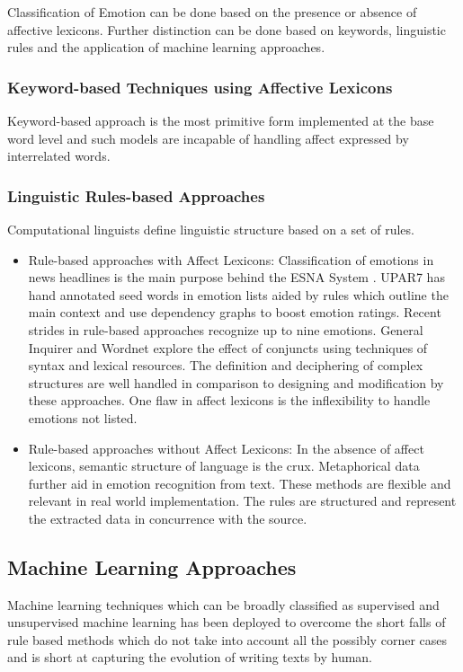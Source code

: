 \documentclass[conference]{IEEEtran}
\numberwithin{equation}{section}
\numberwithin{figure}{section}
\numberwithin{table}{section}
\begin{document}
Classification of Emotion can be done based on the presence or absence of affective lexicons. Further distinction can be done based on keywords, linguistic rules and the application of machine learning approaches. 
\subsubsection{ Keyword-based Techniques using Affective Lexicons}\label{sec:cap-num}
Keyword-based approach is the most primitive form implemented at the base word level and such models are incapable of handling affect expressed by interrelated words. 

\subsubsection{Linguistic Rules-based Approaches}\label{sec:positioning}
Computational linguists define linguistic structure based on a set of rules. 

\begin{itemize}
\item Rule-based approaches with Affect Lexicons: Classification of emotions in news headlines is the main purpose behind the ESNA System \cite{esna}. UPAR7 has hand annotated seed words in emotion lists aided by rules which outline the main context and use dependency graphs to boost emotion ratings. Recent strides in rule-based approaches recognize up to nine emotions. General Inquirer and Wordnet explore the effect of conjuncts using techniques of syntax and lexical resources. The definition and deciphering of complex structures are well handled in comparison to designing and modification by these approaches. One flaw in affect lexicons is the inflexibility to handle emotions not listed. 

\item Rule-based approaches without Affect Lexicons: In the absence of affect lexicons, semantic structure of language is the crux. Metaphorical data further aid in emotion recognition from text. These methods are flexible and relevant in real world implementation. The rules are structured and represent the extracted data in concurrence with the source. 

\end{itemize}


\subsection{Machine Learning Approaches}\label{sec:formatting-text}
Machine learning techniques which can be broadly classified as supervised and unsupervised machine learning has been deployed to overcome the short falls of rule based methods which do not take into account all the possibly corner cases and is short at capturing the evolution of writing texts by human.
\end{document}

